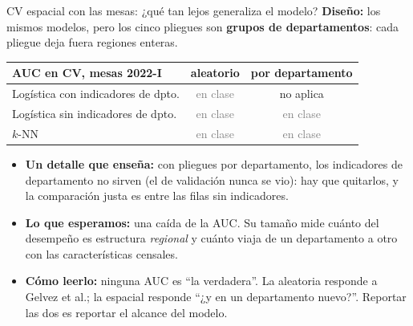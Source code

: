 \documentclass{beamer}
\newcommand{\1}{\mathbb{I}}
\begin{document}
\begin{frame}{CV espacial con las mesas: ¿qué tan lejos generaliza el modelo?}
\small
\textbf{Diseño:} los mismos modelos, pero los cinco pliegues son \textbf{grupos de departamentos}: cada pliegue deja fuera regiones enteras.
\pause
\begin{center}
\footnotesize
\setlength{\tabcolsep}{4pt}
\renewcommand{\arraystretch}{1.15}
\begin{tabular}{lcc}
\hline
AUC en CV, mesas 2022-I & aleatorio & por departamento \\
\hline
Logística con indicadores de dpto. & \textcolor{gray}{en clase} & no aplica \\
Logística sin indicadores de dpto. & \textcolor{gray}{en clase} & \textcolor{gray}{en clase} \\
$k$-NN & \textcolor{gray}{en clase} & \textcolor{gray}{en clase} \\
\hline
\end{tabular}
\end{center}
\pause
\begin{itemize}\itemsep3pt
  \item \textbf{Un detalle que enseña:} con pliegues por departamento, los indicadores de departamento no sirven (el de validación nunca se vio): hay que quitarlos, y la comparación justa es entre las filas sin indicadores. \pause
  \item \textbf{Lo que esperamos:} una caída de la AUC. Su tamaño mide cuánto del desempeño es estructura \emph{regional} y cuánto viaja de un departamento a otro con las características censales. \pause
  \item \textbf{Cómo leerlo:} ninguna AUC es ``la verdadera''. La aleatoria responde a Gelvez et al.; la espacial responde ``¿y en un departamento nuevo?''. Reportar las dos es reportar el alcance del modelo.
\end{itemize}
\end{frame}
\end{document}
